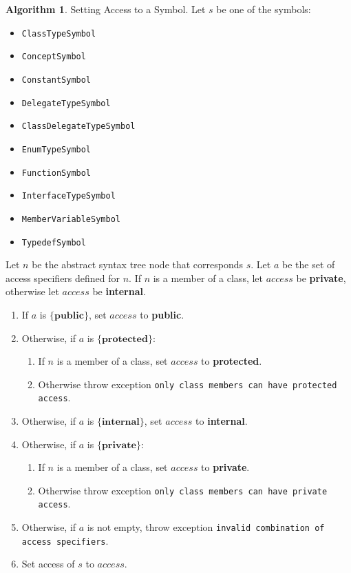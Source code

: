 \documentclass[a4paper,oneside,11pt]{book}
\theoremstyle{definition}
\newtheorem{algo}{Algorithm}[section]
\begin{document}
\begin{algo} Setting Access to a Symbol.
Let $s$ be one of the symbols:
\begin{itemize}
\item
\verb|ClassTypeSymbol|
\item
\verb|ConceptSymbol|
\item
\verb|ConstantSymbol|
\item
\verb|DelegateTypeSymbol|
\item
\verb|ClassDelegateTypeSymbol|
\item
\verb|EnumTypeSymbol|
\item
\verb|FunctionSymbol|
\item
\verb|InterfaceTypeSymbol|
\item
\verb|MemberVariableSymbol|
\item
\verb|TypedefSymbol|
\end{itemize}
Let $n$ be the abstract syntax tree node that corresponds $s$.
Let $a$ be the set of access specifiers defined for $n$.
If $n$ is a member of a class, let $access$ be \textbf{private},
otherwise let $access$ be \textbf{internal}.
\begin{enumerate}
\item
If $a$ is $\{\textbf{public}\}$, set $access$ to \textbf{public}.
\item
Otherwise, if $a$ is $\{\textbf{protected}\}$:
\begin{enumerate}
\item
If $n$ is a member of a class, set $access$ to \textbf{protected}.
\item
Otherwise throw exception \verb|only class members can have protected access|.
\end{enumerate}
\item
Otherwise, if $a$ is $\{\textbf{internal}\}$, set $access$ to \textbf{internal}.
\item
Otherwise, if $a$ is $\{\textbf{private}\}$:
\begin{enumerate}
\item
If $n$ is a member of a class, set $access$ to \textbf{private}.
\item
Otherwise throw exception \verb|only class members can have private access|.
\end{enumerate}
\item
Otherwise, if $a$ is not empty, throw exception \verb|invalid combination of access specifiers|.
\item
Set access of $s$ to $access$.
\end{enumerate}
\end{algo}
\end{document}
